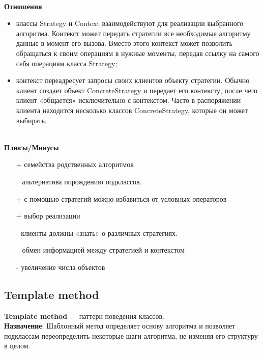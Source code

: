 \documentclass[a3paper,11pt]{report}
\begin{document}
\textbf{\\Отношения}
\begin{itemize}
\item классы Strategy и Context взаимодействуют для реализации выбранного алгоритма. Контекст может передать стратегии все необходимые алгоритму данные в момент его вызова. Вместо этого контекст может позволить обращаться к своим операциям в нужные моменты, передав ссылку на самого себя операциям класса Strategy;
\item контекст переадресует запросы своих клиентов объекту стратегии. Обычно клиент создает объект ConcreteStrategy и передает его контексту, после чего клиент «общается» исключительно с контекстом. Часто в распоряжении клиента находится несколько классов ConcreteStrategy, которые он может выбирать.
\end{itemize}

\textbf{\\Плюсы/Минусы}
\begin{itemize}
\item [+] семейства родственных алгоритмов
\item [~] альтернатива порождению подклассов.
\item [+] с помощью стратегий можно избавиться от условных операторов
\item [+] выбор реализации
\item [-] клиенты должны «знать» о различных стратегиях.
\item [~] обмен информацией между стратегией и контекстом
\item [-] увеличение числа объектов
\end{itemize}

\newpage
\subsection{Template method}

\large\textbf{Template method} --- паттерн поведения классов.
\\
\large\textbf{Назначение}: Шаблонный метод определяет основу алгоритма и позволяет подклассам переопределить некоторые шаги алгоритма, не изменяя его структуру в целом.
\\
\end{document}
